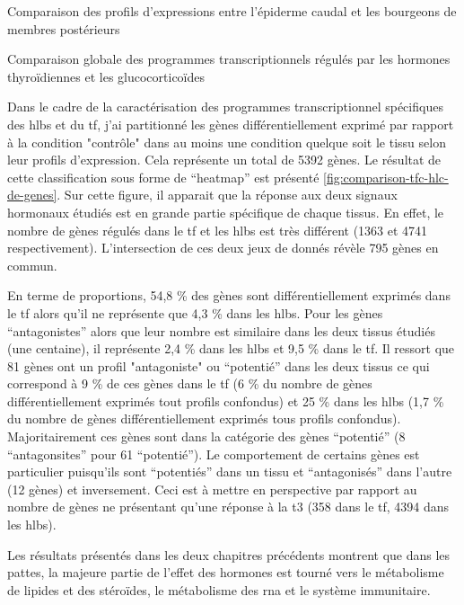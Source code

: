 \documentclass[../main.tex]{subfiles}
\begin{document}
\begin{chapter}{Comparaison des profils d'expressions entre l'épiderme caudal et les bourgeons de membres postérieurs}

\begin{section}{Comparaison globale des programmes transcriptionnels régulés par les hormones thyroïdiennes et les glucocorticoïdes}

Dans le cadre de la caractérisation des programmes transcriptionnel spécifiques des \glspl{hlb} et du \gls{tf}, j'ai partitionné les gènes différentiellement exprimé par rapport à la condition "contrôle" dans au moins une condition quelque soit le tissu selon leur profils d'expression.
Cela représente un total de 5392 gènes.
Le résultat de cette classification sous forme de ``heatmap'' est présenté \autoref{fig:comparison-tfc-hlc-de-genes}.
Sur cette figure, il apparait que la réponse aux deux signaux hormonaux étudiés est en grande partie spécifique de chaque tissus.
En effet, le nombre de gènes régulés dans le \gls{tf} et les \glspl{hlb} est très différent (1363 et 4741 respectivement).
L'intersection de ces deux jeux de donnés révèle 795 gènes en commun.
\par
En terme de proportions, 54,8 \% des gènes sont différentiellement exprimés dans le \gls{tf} alors qu'il ne représente que 4,3 \% dans les \glspl{hlb}.
Pour les gènes ``antagonistes'' alors que leur nombre est similaire dans les deux tissus étudiés (une centaine), il représente 2,4 \% dans les \glspl{hlb} et 9,5 \% dans le \gls{tf}.
Il ressort que 81 gènes ont un profil "antagoniste" ou ``potentié'' dans les deux tissus ce qui correspond à 9 \% de ces gènes dans le \gls{tf} (6 \% du nombre de gènes différentiellement exprimés tout profils confondus) et 25 \% dans les \glspl{hlb} (1,7 \% du nombre de gènes différentiellement exprimés tous profils confondus).
Majoritairement ces gènes sont dans la catégorie des gènes ``potentié'' (8 ``antagonsites'' pour 61 ``potentié'').
Le comportement de certains gènes est particulier puisqu'ils sont ``potentiés'' dans un tissu et ``antagonisés'' dans l'autre (12 gènes) et inversement.
Ceci est à mettre en perspective par rapport au nombre de gènes ne présentant qu'une réponse à la \gls{t3} (358 dans le \gls{tf}, 4394 dans les \glspl{hlb}).
\par
Les résultats présentés dans les deux chapitres précédents montrent que dans les pattes, la majeure partie de l'effet des hormones est tourné vers le métabolisme de lipides et des stéroïdes, le métabolisme des \gls{rna} et le système immunitaire.

\end{section}
\end{chapter}
\end{document}
